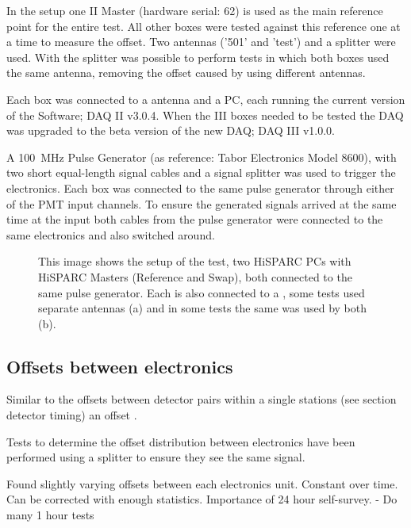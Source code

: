 In the setup one \hisparc II Master (hardware serial: 62) is used as the main reference point for the entire test. All other \hisparc boxes were tested against this reference one at a time to measure the offset. Two \gps antennas ('501' and 'test') and a \gps splitter were used. With the splitter was possible to perform tests in which both \hisparc boxes used the same \gps antenna, removing the offset caused by using different \gps antennas.

Each \hisparc box was connected to a \gps antenna and a PC, each running the current version of the \hisparc Software; \hisparc DAQ II v3.0.4. When the \hisparc III boxes needed to be tested the DAQ was upgraded to the beta version of the new DAQ; \hisparc DAQ III v1.0.0.

A \SI{100}{\mega\hertz} Pulse Generator (as reference: Tabor Electronics Model 8600), with two short equal-length signal cables and a signal splitter was used to trigger the \hisparc electronics. Each box was connected to the same pulse generator through either of the PMT input channels. To ensure the generated signals arrived at the same time at the input both cables from the pulse generator were connected to the same \hisparc electronics and also switched around.

\begin{figure}
    \centering
    
    \caption{This image shows the setup of the test, two HiSPARC PCs
             with HiSPARC Masters (Reference and Swap), both connected
             to the same pulse generator. Each is also connected to a
             \gps, some tests used separate \gps antennas (a) and in
             some tests the same \gps was used by both (b).}
    \label{fig:setup}
\end{figure}


\subsection{Offsets between \hisparc electronics}
\label{sub:gps_offsets}

Similar to the offsets between detector pairs within a single stations (see section detector timing) an offset .

Tests to determine the offset distribution between \hisparc electronics have been performed using a \gps splitter to ensure they see the same \gps signal.

Found slightly varying offsets between each \hisparc electronics unit. Constant over time. Can be corrected with enough statistics. Importance of 24 hour self-survey. - Do many 1 hour tests

